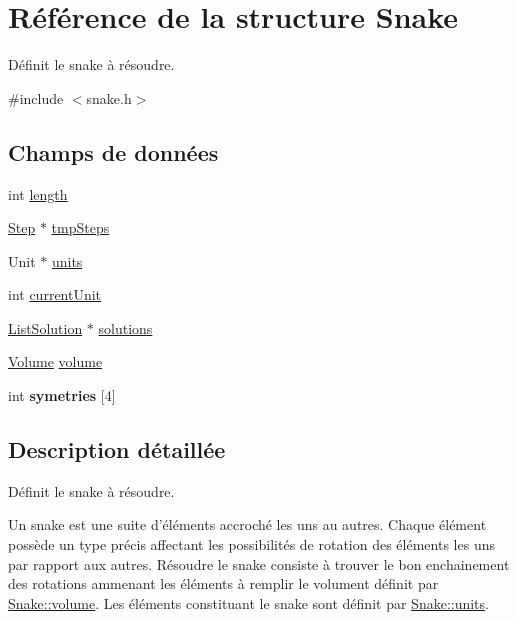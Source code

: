 \hypertarget{struct_snake}{\section{Référence de la structure Snake}
\label{struct_snake}
}


Définit le snake à résoudre.  




{\ttfamily \#include $<$snake.\-h$>$}

\subsection*{Champs de données}
\begin{DoxyCompactItemize}
\item 
int \hyperlink{struct_snake_af9d495c1655d813d553030485d00fea7}{length}
\item 
\hyperlink{struct_step}{Step} $\ast$ \hyperlink{struct_snake_a99a4f4239fb1568fe35d9a081c9b2660}{tmp\-Steps}
\item 
Unit $\ast$ \hyperlink{struct_snake_a2ff02817760e56a95b3b1bc7cfa1b77b}{units}
\item 
int \hyperlink{struct_snake_a1e5f8a70f50d68340f54ac884c05dcff}{current\-Unit}
\item 
\hyperlink{struct_list_solution}{List\-Solution} $\ast$ \hyperlink{struct_snake_a97be9d71c3998b7a3a97e9403e375979}{solutions}
\item 
\hyperlink{struct_volume}{Volume} \hyperlink{struct_snake_a9bc498ccac8db41438f855f5dd3f4c05}{volume}
\item 
\hypertarget{struct_snake_a9bb94a758344ce8b7ebf170b8389fa36}{int {\bfseries symetries} \mbox{[}4\mbox{]}}\label{struct_snake_a9bb94a758344ce8b7ebf170b8389fa36}

\end{DoxyCompactItemize}


\subsection{Description détaillée}
Définit le snake à résoudre. 

Un snake est une suite d'éléments accroché les uns au autres. Chaque élément possède un type précis affectant les possibilités de rotation des éléments les uns par rapport aux autres. Résoudre le snake consiste à trouver le bon enchainement des rotations ammenant les éléments à remplir le volument définit par \hyperlink{struct_snake_a9bc498ccac8db41438f855f5dd3f4c05}{Snake\-::volume}. Les éléments constituant le snake sont définit par \hyperlink{struct_snake_a2ff02817760e56a95b3b1bc7cfa1b77b}{Snake\-::units}. 

